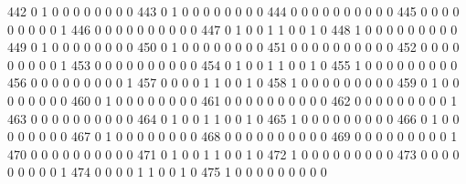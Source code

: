 \documentclass[compress,8pt]{beamer}
\begin{document}
\begin{frame}
\begin{Schunk}
  442      0       1   0              0        0    0       0       0   0   0
  443      0       1   0              0        0    0       0       0   0   0
  444      0       0   0              0        0    0       0       0   0   0
  445      0       0   0              0        0    0       0       0   0   1
  446      0       0   0              0        0    0       0       0   0   0
  447      0       1   0              0        1    1       0       0   1   0
  448      1       0   0              0        0    0       0       0   0   0
  449      0       1   0              0        0    0       0       0   0   0
  450      0       1   0              0        0    0       0       0   0   0
  451      0       0   0              0        0    0       0       0   0   0
  452      0       0   0              0        0    0       0       0   0   1
  453      0       0   0              0        0    0       0       0   0   0
  454      0       1   0              0        1    1       0       0   1   0
  455      1       0   0              0        0    0       0       0   0   0
  456      0       0   0              0        0    0       0       0   0   1
  457      0       0   0              0        1    1       0       0   1   0
  458      1       0   0              0        0    0       0       0   0   0
  459      0       1   0              0        0    0       0       0   0   0
  460      0       1   0              0        0    0       0       0   0   0
  461      0       0   0              0        0    0       0       0   0   0
  462      0       0   0              0        0    0       0       0   0   1
  463      0       0   0              0        0    0       0       0   0   0
  464      0       1   0              0        1    1       0       0   1   0
  465      1       0   0              0        0    0       0       0   0   0
  466      0       1   0              0        0    0       0       0   0   0
  467      0       1   0              0        0    0       0       0   0   0
  468      0       0   0              0        0    0       0       0   0   0
  469      0       0   0              0        0    0       0       0   0   1
  470      0       0   0              0        0    0       0       0   0   0
  471      0       1   0              0        1    1       0       0   1   0
  472      1       0   0              0        0    0       0       0   0   0
  473      0       0   0              0        0    0       0       0   0   1
  474      0       0   0              0        1    1       0       0   1   0
  475      1       0   0              0        0    0       0       0   0   0

\end{Schunk}
\end{frame}
\end{document}
